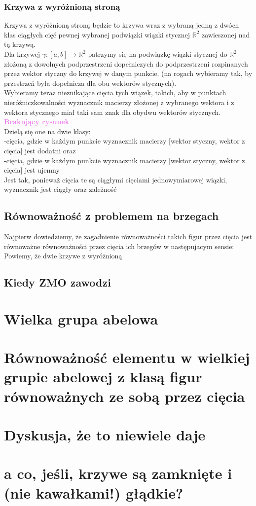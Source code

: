 \documentclass[a4paper, 12pt]{article}
\newcommand{\rysunek}[1]{\hfill \break\\[16pt] \Huge \textbf{\textcolor{violet}{Brakujący rysunek \normalsize
#1}} \hfill
\break \\[16pt] \normalsize}
\begin{document}
\subsubsection{Krzywa z wyróżnioną stroną}
Krzywa z wyróżnioną stroną będzie to krzywa wraz z wybraną jedną z dwóch klas ciągłych cięć pewnej wybranej
 podwiązki wiązki stycznej $\mathbb{R}^2$ zawieszonej nad tą krzywą. \\
Dla krzywej $\gamma : [a, b] \to \mathbb{R}^2$ patrzymy się na podwiązkę wiązki stycznej do
$\mathbb{R}^2$ złożoną
z dowolnych podprzestrzeni dopełniczych do podprzestrzeni rozpinanych przez wektor styczny do krzywej w
danym punkcie. (na rogach wybieramy tak, by przestrzeń była dopełnicza dla obu wektorów stycznych). \\
Wybieramy teraz nieznikające cięcia tych wiązek, takich, aby w punktach nieróżniczkowalności
wyznacznik macierzy złożonej z wybranego wektora i z wektora stycznego miał taki sam znak dla obydwu
wektorów stycznych.
\rysunek{}
Dzielą się one na dwie klasy: \\
-cięcia, gdzie w każdym punkcie wyznacznik macierzy [wektor styczny, wektor z cięcia] jest dodatni oraz\\
-cięcia, gdzie w każdym punkcie wyznacznik macierzy [wektor styczny, wektor z cięcia] jest ujemny \\
Jest tak, ponieważ cięcia te są ciągłymi cięciami jednowymiarowej wiązki, wyznacznik jest ciągły oraz
zależność
\subsection{Równoważność z problemem na brzegach}
Najpierw dowiedziemy, że zagadnienie równoważności takich figur przez cięcia jest równoważne równoważności
przez cięcia ich brzegów w następujacym sensie: \\
Powiemy, że dwie krzywe z wyróżnioną

\subsection{Kiedy ZMO zawodzi}

\section{Wielka grupa abelowa}

\section{Równoważność elementu w wielkiej grupie abelowej z klasą figur równoważnych ze sobą przez cięcia}

\section{Dyskusja, że to niewiele daje}

\section{a co, jeśli, krzywe są zamknięte i (nie kawałkami!) głądkie?}
\end{document}
